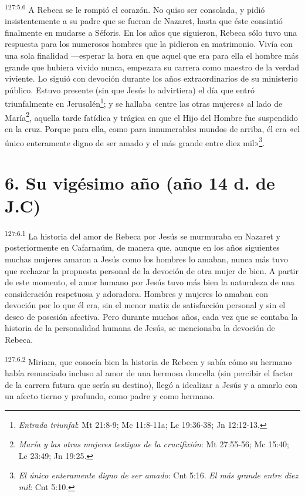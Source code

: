 \par
\textsuperscript{127:5.6} A Rebeca se le rompió el corazón. No quiso ser consolada, y pidió insistentemente a su padre que se fueran de Nazaret, hasta que éste consintió finalmente en mudarse a Séforis. En los años que siguieron, Rebeca sólo tuvo una respuesta para los numerosos hombres que la pidieron en matrimonio. Vivía con una sola finalidad ---esperar la hora en que aquel que era para ella el hombre más grande que hubiera vivido nunca, empezara su carrera como maestro de la verdad viviente. Lo siguió con devoción durante los años extraordinarios de su ministerio público. Estuvo presente (sin que Jesús lo advirtiera) el día que entró triunfalmente en Jerusalén\footnote{\textit{Entrada triunfal}: Mt 21:8-9; Mc 11:8-11a; Lc 19:36-38; Jn 12:12-13.}; y se hallaba «entre las otras mujeres» al lado de María\footnote{\textit{María y las otras mujeres testigos de la crucifixión}: Mt 27:55-56; Mc 15:40; Lc 23:49; Jn 19:25.}, aquella tarde fatídica y trágica en que el Hijo del Hombre fue suspendido en la cruz. Porque para ella, como para innumerables mundos de arriba, él era «el único enteramente digno de ser amado y el más grande entre diez mil»\footnote{\textit{El único enteramente digno de ser amado}: Cnt 5:16. \textit{El más grande entre diez mil}: Cnt 5:10.}.

\section*{6. Su vigésimo año (año 14 d. de J.C)}
\par
\textsuperscript{127:6.1} La historia del amor de Rebeca por Jesús se murmuraba en Nazaret y posteriormente en Cafarnaúm, de manera que, aunque en los años siguientes muchas mujeres amaron a Jesús como los hombres lo amaban, nunca más tuvo que rechazar la propuesta personal de la devoción de otra mujer de bien. A partir de este momento, el amor humano por Jesús tuvo más bien la naturaleza de una consideración respetuosa y adoradora. Hombres y mujeres lo amaban con devoción por lo que él era, sin el menor matiz de satisfacción personal y sin el deseo de posesión afectiva. Pero durante muchos años, cada vez que se contaba la historia de la personalidad humana de Jesús, se mencionaba la devoción de Rebeca.

\par
\textsuperscript{127:6.2} Miriam, que conocía bien la historia de Rebeca y sabía cómo su hermano había renunciado incluso al amor de una hermosa doncella (sin percibir el factor de la carrera futura que sería su destino), llegó a idealizar a Jesús y a amarlo con un afecto tierno y profundo, como padre y como hermano.

